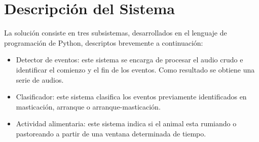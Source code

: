 \documentclass[11pt]{charter}
\begin{document}
\section{Descripción del Sistema}
\label{sec:descripcion}
La solución consiste en tres subsistemas, desarrollados en el lenguaje de programación de Python, descriptos brevemente a continuación:
\begin{itemize}
	\item Detector de eventos: este sistema se encarga de procesar el audio crudo e identificar el comienzo y el fin de los eventos. Como resultado se obtiene una serie de audios.
	\item Clasificador: este sistema clasifica los eventos previamente identificados en masticación, arranque o arranque-masticación.
	\item Actividad alimentaria: este sistema indica si el animal esta rumiando o pastoreando a partir de una ventana determinada de tiempo.
\end{itemize}
\end{document}
